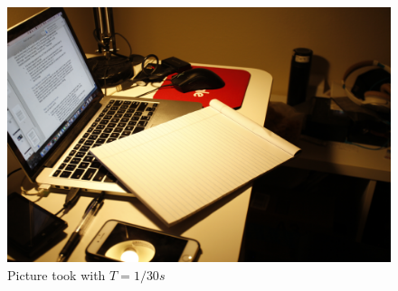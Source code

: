 \documentclass[10pt,twocolumn,letterpaper]{article}
\begin{document}
\begin{figure}[bhp]
\includegraphics[width=\columnwidth]{images/_MG_6277}
\caption{Picture took with $T = 1/30s$}

\label{fig:samplepicture}
\end{figure}
\end{document}
